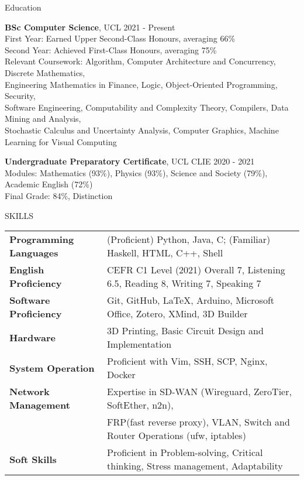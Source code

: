 \documentclass{resume} %
\begin{document}
\begin{rSection}{Education}

{\bf BSc Computer Science}, UCL \hfill {2021 - Present}\\
First Year: Earned Upper Second-Class Honours, averaging 66\% \\
Second Year: Achieved First-Class Honours, averaging 75\% \\
Relevant Coursework: Algorithm, Computer Architecture and Concurrency, Discrete Mathematics, \\
Engineering Mathematics in Finance, Logic, Object-Oriented Programming, Security, \\
Software Engineering, Computability and Complexity Theory, Compilers, Data Mining and Analysis, \\
Stochastic Calculus and Uncertainty Analysis, Computer Graphics, Machine Learning for Visual Computing

{\bf Undergraduate Preparatory Certificate}, UCL CLIE \hfill {2020 - 2021}\\
Modules: Mathematics (93\%), Physics (93\%), Science and Society (79\%), Academic English (72\%)\\
Final Grade: 84\%, Distinction

\end{rSection}

\begin{rSection}{SKILLS}

\begin{tabular}{ @{} >{\bfseries}l @{\hspace{6ex}} l }
Programming Languages & (Proficient) Python, Java, C; (Familiar) Haskell, HTML, C++, Shell
\\
English Proficiency & CEFR C1 Level (2021) Overall 7, Listening 6.5, Reading 8, Writing 7, Speaking 7
\\
Software Proficiency & Git, GitHub, \LaTeX, Arduino, Microsoft Office, Zotero, XMind, 3D Builder
\\
Hardware & 3D Printing, Basic Circuit Design and Implementation
\\
System Operation & Proficient with Vim, SSH, SCP, Nginx, Docker
\\
Network Management & Expertise in SD-WAN (Wireguard, ZeroTier, SoftEther, n2n), \\ 
& FRP(fast reverse proxy), VLAN, Switch and Router Operations (ufw, iptables)\\
Soft Skills & Proficient in Problem-solving, Critical thinking, Stress management, Adaptability
\end{tabular}
\end{rSection}
\end{document}
